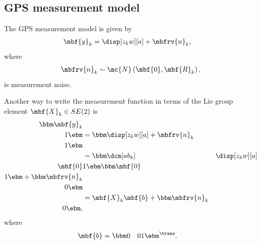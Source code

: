 \documentclass[ nobib, nofonts, notoc]{tufte-handout}
\begin{document}
    \subsection{GPS measurement model}
    The GPS measurement model is given by
    \begin{align}
        \mbf{y}_{k} &= \disp[z_{k}w][a] + \mbfrv{n}_{k},
    \end{align}
    where
    \begin{align}
        \mbfrv{n}_{k}\sim\mc{N}\left( \mbf{0}, \mbf{R}_{k} \right),
    \end{align}
    is measurement noise.

    Another way to write the measurement function in terms of the Lie group element $\mbf{X}_{k}\in SE(2)$ is
    \begin{align}
        \bbm
            \mbf{y}_{k}\\
            1
        \ebm
        &=
        \bbm
        \disp[z_{k}w][a] + \mbfrv{n}_{k}\\
        1
        \ebm\\
        &=
        \bbm
            \dcm[ab_{k}] & \disp[z_{k}w][a] \\
            \mbf{0} & 1
        \ebm
        \bbm
            \mbf{0} \\ 1
        \ebm
        +
        \bbm
            \mbfrv{n}_{k}\\
            0
        \ebm\\
        \label{eq:meas. model GPS Lie group}
        &=
        \mbf{X}_{k}\mbf{b} + \bbm \mbfrv{n}_{k} \\ 0 \ebm,
    \end{align}
    where
    \begin{align}
        \mbf{b}
        &=
        \bbm 0 & 0 & 1 \ebm^{\trans}.
    \end{align}

\end{document}
